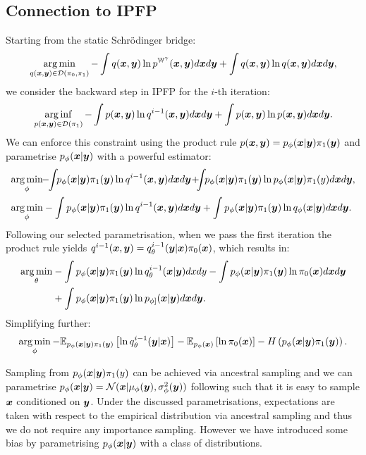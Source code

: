 \documentclass[a4paper,12pt,twoside,openright]{report}
\theoremstyle{definition}
\begin{document}
\subsection{Connection to IPFP}
Starting from the static Schrödinger bridge: 
\begin{align*}
\operatorname*{arg\,min}_{q({\bm{x}},{\bm{y}}) \in \mathcal{D}(\pi_0, \pi_1)}- \int q({\bm{x}},{\bm{y}}) \operatorname{ln} p^{\mathbb{W}^{\gamma}}({\bm{x}} ,{\bm{y}} )d{\bm{x}} d{\bm{y}} +\int q({\bm{x}},{\bm{y}}) \operatorname{ln} q({\bm{x}} ,{\bm{y}} )d{\bm{x}} d{\bm{y}},
\end{align*}
we consider the backward step in IPFP for the $i$-th iteration:
\begin{align*}
\operatorname*{arg\,inf}_{p({\bm{x}},{\bm{y}})  \in \mathcal{D}(\pi_1)}- \int p({\bm{x}},{\bm{y}})  \operatorname{ln} q^{i-1}({\bm{x}},{\bm{y}})d{\bm{x}} d{\bm{y}} +\int  p({\bm{x}},{\bm{y}}) \operatorname{ln}  p({\bm{x}},{\bm{y}}) d{\bm{x}} d{\bm{y}}.
\end{align*}
We can enforce this constraint using the product rule $p({\bm{x}},{\bm{y}}) = p_{\phi}({\bm{x}}|{\bm{y}}) \pi_1({\bm{y}})$  and parametrise $p_{\phi}({\bm{x}}|{\bm{y}})$ with a powerful estimator:
\begin{align*}
\argmin_{\phi}&\!\!-\!\!\int\!\!p_{\phi}(\vx|\vy) \pi_1(\vy) \log q^{i-1}(\vx,\vy)d\vx d\vy\!+\!\!\!\int\!\!p_{\phi}(\vx|\vy) \pi_1(\vy) \log p_{\phi}(\vx|\vy)
\pi_1(y)d\vx d\vy,\\
\argmin_{\phi}&- \int p_{\phi}(\vx|\vy) \pi_1(\vy) \log q^{i-1}(\vx,\vy)d\vx d\vy +\int p_{\phi}(\vx|\vy)\pi_1(\vy) \log q_{\phi}(\vx|\vy)
d\vx d\vy.
\end{align*}
Following our selected parametrisation, when we pass the first iteration the product rule yields $q^{i-1}({\bm{x}} , {\bm{y}})= q^{i-1}_{\theta}({\bm{y}}|{\bm{x}})\pi_0({\bm{x}})$, which results in:
\begin{align*}
\operatorname*{arg\,min}_\theta&- \int p_{\phi}({\bm{x}}|{\bm{y}}) \pi_1({\bm{y}}) \operatorname{ln}  q^{i-1}_{\theta}({\bm{x}}|{\bm{y}})dxdy - \int p_{\phi}({\bm{x}}|{\bm{y}}) \pi_1({\bm{y}}) \operatorname{ln}  \pi_0({\bm{x}}) d{\bm{x}} d{\bm{y}} \\
&+\int p_{\phi}({\bm{x}}|{\bm{y}}) \pi_1({\bm{y}}) \operatorname{ln} p_{\phi]}({\bm{x}}|{\bm{y}})d{\bm{x}} d{\bm{y}}.
\end{align*}
Simplifying further:
\begin{align*}
\operatorname*{arg\,min}_\phi- \mathbb{E}_{p_{\phi}({\bm{x}}|{\bm{y}})\pi_1({\bm{y}})}\left[  \operatorname{ln}  q^{i-1}_{\theta}({\bm{y}}|{\bm{x}})\right] -  \mathbb{E}_{p_{\phi}({\bm{x}})}\left[ \operatorname{ln}  \pi_0({\bm{x}}) \right] - H\left(p_{\phi}({\bm{x}}|{\bm{y}})\pi_1({\bm{y}})\right).
\end{align*}

Sampling from $p_{\phi}({\bm{x}}|{\bm{y}})\pi_1(y)$ can be achieved via  ancestral sampling and we can parametrise $p_{\phi}({\bm{x}}|{\bm{y}})={\mathcal{N}}({\bm{x}} | \mu_{\phi}({\bm{y}}), \sigma^2_\phi({\bm{y}}))$ following \cite{kingma2013auto} such that it is easy to sample ${\bm{x}}$ conditioned on ${\bm{y}}$. Under the discussed parametrisations, expectations are taken with respect to the empirical distribution via ancestral sampling and thus we do not require any importance sampling. However we have introduced some bias by parametrising $p_{\phi}({\bm{x}}|{\bm{y}})$ with a class of distributions.
\end{document}
